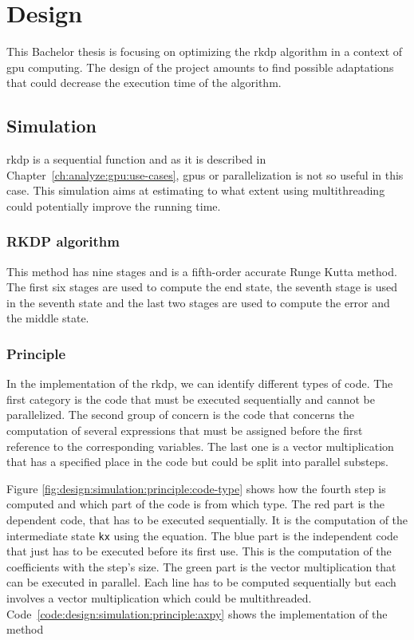 \chapter{Design}
\label{ch:design}

This Bachelor thesis is focusing on optimizing the \acrlong{rkdp} algorithm
in a context of \acrshort{gpu} computing.
The design of the project amounts to find possible adaptations that could
decrease the execution time of the algorithm.

\section{Simulation}
\label{ch:design:simulation}

\acrshort{rkdp} is a sequential function and as it is described in Chapter~\ref{ch:analyze:gpu:use-cases},
\acrshort{gpu}s or parallelization is not so useful in this case.
This simulation aims at estimating to what extent using multithreading could
potentially improve the running time.

\subsection{RKDP algorithm}
\label{ch:design:simulation:rkdp}

This method has nine stages and is a fifth-order accurate Runge Kutta method.
The first six stages are used to compute the end state, the seventh stage is used
in the seventh state and the last two stages are used to compute the error and the
middle state.

\subsection{Principle}
\label{ch:design:simulation:principle}

In the implementation of the \acrshort{rkdp}, we can identify different types of
code.
The first category is the code that must be executed sequentially and cannot be
parallelized.
The second group of concern is the code that concerns the computation of several
expressions that must be assigned before the first reference to the
corresponding variables.
The last one is a vector multiplication that has a specified place in the code
but could be split into parallel substeps.

Figure \ref{fig:design:simulation:principle:code-type} shows how the
fourth step is computed and which part of the code is from which type.
The red part is the dependent code, that has to be executed sequentially.
It is the computation of the intermediate state \texttt{kx} using the equation.
The blue part is the independent code that just has to be executed before its
first use. This is the computation of the coefficients with the step's size.
The green part is the vector multiplication that can be executed in parallel.
Each line has to be computed sequentially but each involves a vector
multiplication which could be multithreaded.
Code~\ref{code:design:simulation:principle:axpy} shows the implementation of the
method

